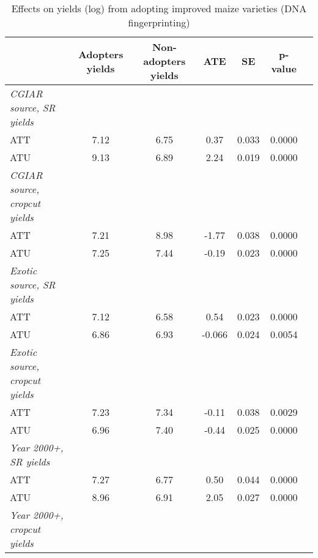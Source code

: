 \begin{table}[H]
\centering
\hspace*{-1.2cm}
\begin{threeparttable}
\caption{Effects on yields (log) from adopting improved maize varieties (DNA fingerprinting)}
\label{tab:switch3}
\begin{tabular}{l cccccc}
\hline
\hline
            &Adopters yields&Non-adopters yields&         ATE&          SE&     p-value\\
\hline
\textit{CGIAR source, SR yields}&            &            &            &            &            \\
ATT         &        7.12&        6.75&        0.37&       0.033&      0.0000\\
%
%
%
ATU         &        9.13&        6.89&        2.24&       0.019&      0.0000\\
%
%
%
\textit{CGIAR source, cropcut yields}&            &            &            &            &            \\
ATT         &        7.21&        8.98&       -1.77&       0.038&      0.0000\\
%
%
%
ATU         &        7.25&        7.44&       -0.19&       0.023&      0.0000\\
%
%
%
\textit{Exotic source, SR yields}&            &            &            &            &            \\
ATT         &        7.12&        6.58&        0.54&       0.023&      0.0000\\
%
%
%
ATU         &        6.86&        6.93&      -0.066&       0.024&      0.0054\\
%
%
%
\textit{Exotic source, cropcut yields}&            &            &            &            &            \\
ATT         &        7.23&        7.34&       -0.11&       0.038&      0.0029\\
%
%
%
ATU         &        6.96&        7.40&       -0.44&       0.025&      0.0000\\
%
%
%
\textit{Year 2000+, SR yields}&            &            &            &            &            \\
ATT         &        7.27&        6.77&        0.50&       0.044&      0.0000\\
%
%
%
ATU         &        8.96&        6.91&        2.05&       0.027&      0.0000\\
%
%
%
\textit{Year 2000+, cropcut yields}&            &            &            &            &            \\

\end{tabular}
\end{threeparttable}
\end{table}
